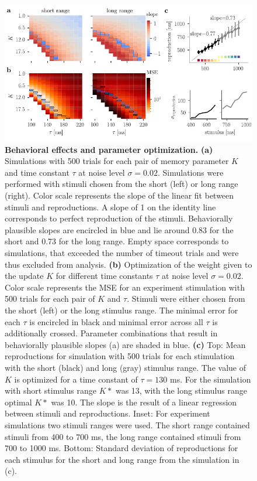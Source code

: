 \documentclass[10pt]{article}
\begin{document}
\begin{figure}[ht]
	\centering
	\includegraphics{figures/interIparams.pdf}
	\caption{\textbf{Behavioral effects and parameter optimization.} 
	\textbf{(a)} Simulations with 500 trials for each pair of memory parameter $K$ and time constant $\tau$ at noise level $\sigma = 0.02$. Simulations were performed with stimuli chosen from the short (left) or long range (right). Color scale represents the slope of the linear fit between stimuli and reproductions. A slope of 1 on the identity line corresponds to perfect reproduction of the stimuli. Behaviorally plausible slopes are encircled in blue and lie around 0.83 for the short and 0.73 for the long range. Empty space corresponds to simulations, that exceeded the number of timeout trials and were thus excluded from analysis.
	\textbf{(b)} Optimization of the weight given to the update $K$ for different time constants $\tau$ at noise level $\sigma = 0.02$. Color scale represents the MSE for an experiment stimulation with 500 trials for each pair of $K$ and $\tau$. Stimuli were either chosen from the short (left) or the long stimulus range. The minimal error for each $\tau$ is encircled in black and minimal error across all $\tau$ is additionally crossed. Parameter combinations that result in behaviorally plausible slopes (a) are shaded in blue.
	\textbf{(c)} Top: Mean reproductions for simulation with 500 trials for each stimulation with the short (black) and long (gray) stimulus range. The value of $K$ is optimized for a time constant of $\tau = 130$ ms. For the simulation with short stimulus range $K*$ was 13, with the long stimulus range optimal $K*$ was 10. 
		The slope is the result of a linear regression between stimuli and reproductions.
		Inset: For experiment simulations two stimuli ranges were used. The short range contained stimuli from 400 to 700 ms, the long range contained stimuli from 700 to 1000 ms.
		Bottom: Standard deviation of reproductions for each stimulus for the short and long range from the simulation in (c).
	}
\label{fig:parameter}
\end{figure}
\end{document}
